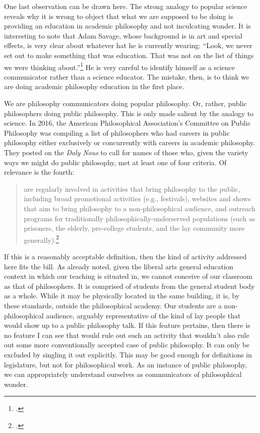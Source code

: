 \documentclass[letterpaper,notitlepage,12pt]{article}
\begin{document}
One last observation can be drawn here.
The strong analogy to popular science reveals why it is wrong to object that
what we are supposed to be doing is providing an education in academic
philosophy and not inculcating wonder.
It is interesting to note that Adam Savage, whose background is in art and
special effects, is very clear about whatever hat he is currently wearing:
``Look, we never set out to make something that was education. That was not on
the list of things we were thinking about.''\footcite{lahey_mythbusters_2014}
He is very careful to identify himself as a science communicator rather than a
science educator.
The mistake, then, is to think we are doing academic philosophy education in the
first place.

We are philosophy communicators doing popular philosophy.
Or, rather, public philosophers doing public philosophy.
This is only made salient by the analogy to science.
In 2016, the American Philosophical Association's Committee on Public Philosophy
was compiling a list of philosophers who had careers in public philosophy either
exclusively or concurrently with careers in academic philosophy.
They posted on the \textit{Daly Nous} to call for names of those who, given the
variety ways we might do public philosophy, met at least one of four criteria.
Of relevance is the fourth: 
\begin{quotation}
  are regularly involved in activities that bring
philosophy to the public, including broad promotional activities (e.g.,
festivals), websites and shows that aim to bring philosophy to a
non-philosophical audience, and outreach programs for traditionally
philosophically-underserved populations (such as prisoners, the elderly,
pre-college students, and the lay community more
generally).\footcite{weinberg_who_2016}
\end{quotation}
If this is a reasonably acceptable definition, then the kind of activity
addressed here fits the bill.
As already noted, given the liberal arts general education context in which our
teaching is situated in, we cannot conceive of our classroom as that of
philosophers.
It is comprised of students from the general student body as a whole.
While it may be physically located in the same building, it is, by these
standards, outside the philosophical academy.
Our students are a non-philosophical audience, arguably representative of the
kind of lay people that would show up to a public philosophy talk.
If this feature pertains, then there is no feature I can see that would rule out
such an activity that wouldn't also rule out some more conventionally accepted
case of public philosophy.
It can only be excluded by singling it out explicitly.
This may be good enough for definitions in legislature, but not for
philosophical work.
As an instance of public philosophy, we can appropriately understand ourselves
as communicators of philosophical wonder.
\end{document}
